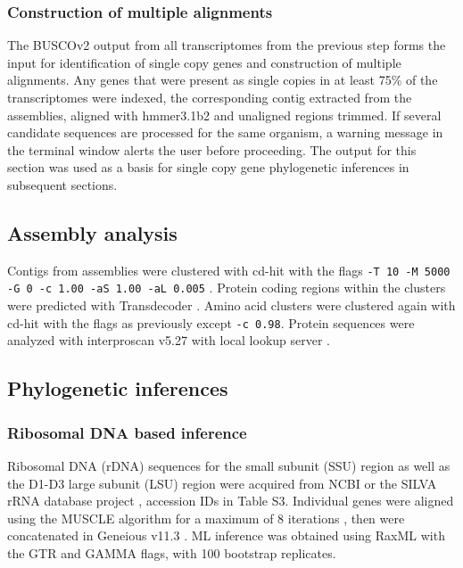 \documentclass[12pt]{article}
\begin{document}
\subsubsection{Construction of multiple alignments}
The BUSCOv2 output from all transcriptomes from the previous step forms the input for identification of single copy genes and construction of multiple alignments. 
Any genes that were present as single copies in at least 75\% of the transcriptomes were indexed, the corresponding contig extracted from the assemblies, aligned with hmmer3.1b2 \cite{eddy2015hmmer} and unaligned regions trimmed.
If several candidate sequences are processed for the same organism, a warning message in the terminal window alerts the user before proceeding. 
The output for this section was used as a basis for single copy gene phylogenetic inferences in subsequent sections.

\subsection{Assembly analysis}
Contigs from assemblies were clustered with cd-hit with the flags \texttt{-T 10 -M 5000 -G 0 -c 1.00 -aS 1.00 -aL 0.005} \cite{fu2012cd}. 
Protein coding regions within the clusters were predicted with Transdecoder \cite{haas2016transdecoder}. 
Amino acid clusters were clustered again with cd-hit with the flags as previously except \texttt{-c 0.98}.
Protein sequences were analyzed with interproscan v5.27 with local lookup server \cite{quevillon2005interproscan}.

\subsection{Phylogenetic inferences}
\subsubsection{Ribosomal DNA based inference}
Ribosomal DNA (rDNA) sequences for the small subunit (SSU) region as well as the D1-D3 large subunit (LSU) region were acquired from NCBI \cite{coordinators2017database} or the SILVA rRNA database project \cite{silvaproj}, accession IDs in Table S3. 
Individual genes were aligned using the MUSCLE algorithm for a maximum of 8 iterations \cite{edgar2004muscle}, then were concatenated in Geneious v11.3 \cite{kearse2012geneious}.
ML inference was obtained using RaxML \cite{stamatakis2014raxml} with the GTR and GAMMA flags, with 100 bootstrap replicates.
\end{document}
